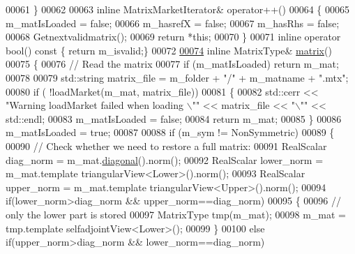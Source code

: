 \begin{DoxyCode}
00061     \}
00062     
00063     \textcolor{keyword}{inline} MatrixMarketIterator& operator++()
00064     \{
00065       m\_matIsLoaded = \textcolor{keyword}{false};
00066       m\_hasrefX = \textcolor{keyword}{false};
00067       m\_hasRhs = \textcolor{keyword}{false};
00068       Getnextvalidmatrix();
00069       \textcolor{keywordflow}{return} *\textcolor{keyword}{this};
00070     \}
00071     \textcolor{keyword}{inline} \textcolor{keyword}{operator} bool()\textcolor{keyword}{ const }\{ \textcolor{keywordflow}{return} m\_isvalid;\}
00072     
\hyperlink{class_eigen_1_1_matrix_market_iterator_ac938961d685306ef5b48d9943f7dcabd}{00074}     \textcolor{keyword}{inline} MatrixType& \hyperlink{class_eigen_1_1_matrix_market_iterator_ac938961d685306ef5b48d9943f7dcabd}{matrix}() 
00075     \{ 
00076       \textcolor{comment}{// Read the matrix}
00077       \textcolor{keywordflow}{if} (m\_matIsLoaded) \textcolor{keywordflow}{return} m\_mat;
00078       
00079       std::string matrix\_file = m\_folder + \textcolor{stringliteral}{"/"} + m\_matname + \textcolor{stringliteral}{".mtx"};
00080       \textcolor{keywordflow}{if} ( !loadMarket(m\_mat, matrix\_file)) 
00081       \{
00082         std::cerr << \textcolor{stringliteral}{"Warning loadMarket failed when loading \(\backslash\)""} << matrix\_file << \textcolor{stringliteral}{"\(\backslash\)""} << std::endl;
00083         m\_matIsLoaded = \textcolor{keyword}{false};
00084         \textcolor{keywordflow}{return} m\_mat;
00085       \}
00086       m\_matIsLoaded = \textcolor{keyword}{true}; 
00087 
00088       \textcolor{keywordflow}{if} (m\_sym != NonSymmetric) 
00089       \{
00090         \textcolor{comment}{// Check whether we need to restore a full matrix:}
00091         RealScalar diag\_norm  = m\_mat.\hyperlink{group___sparse_core___module_a4423486f9fd64cbac7be06c748b37e0a}{diagonal}().norm();
00092         RealScalar lower\_norm = m\_mat.template triangularView<Lower>().norm();
00093         RealScalar upper\_norm = m\_mat.template triangularView<Upper>().norm();
00094         \textcolor{keywordflow}{if}(lower\_norm>diag\_norm && upper\_norm==diag\_norm)
00095         \{
00096           \textcolor{comment}{// only the lower part is stored}
00097           MatrixType tmp(m\_mat);
00098           m\_mat = tmp.template selfadjointView<Lower>();
00099         \}
00100         \textcolor{keywordflow}{else} \textcolor{keywordflow}{if}(upper\_norm>diag\_norm && lower\_norm==diag\_norm)

\end{DoxyCode}
